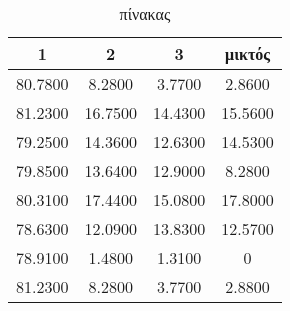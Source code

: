 \begin{table}
\centering
\begin{tabular}{ |c|c|c|c|  }
\hline
1 & 2 & 3 & μικτός\\
\hline

   80.7800   & 8.2800 &   3.7700 &   2.8600\\
   \hline
   81.2300   &16.7500 &  14.4300 &  15.5600\\
\hline   
   79.2500   &14.3600 &  12.6300 &  14.5300\\
\hline
   79.8500   &13.6400 &  12.9000 &   8.2800\\
\hline   
   80.3100   &17.4400 &  15.0800 & 17.8000\\
   \hline
   78.6300   &12.0900 &  13.8300 &  12.5700\\
\hline   
   78.9100   & 1.4800 &   1.3100 &        0\\
\hline   
   81.2300   & 8.2800 &   3.7700 &   2.8800\\
\hline   
   \end{tabular}
\caption{πίνακας }
\label{tab:F1scoretypes}
\end{table}